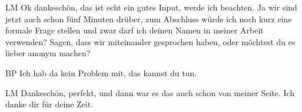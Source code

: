 \begin{xlist}
    \item[LM] Ok dankeschön, das ist echt ein gutes Input, werde ich beachten. Ja wir sind jetzt auch schon fünf Minuten drüber, zum Abschluss würde ich noch kurz eine formale Frage stellen und zwar darf ich deinen Namen in meiner Arbeit verwenden? Sagen, dass wir miteinander gesprochen haben, oder möchtest du es lieber anonym machen?
    \item[BP] Ich hab da kein Problem mit, das kannst du tun.
    \item[LM] Dankeschön, perfekt, und dann war es das auch schon von meiner Seite. Ich danke dir für deine Zeit. 
\end{xlist}

